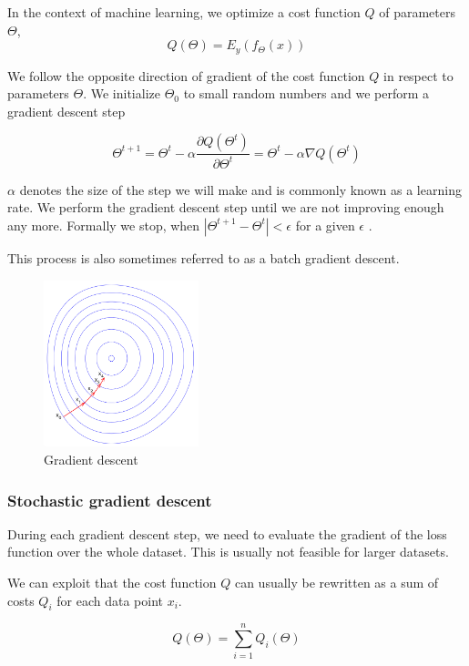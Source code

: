     In the context of machine learning, we optimize a cost function $Q$ of parameters $\Theta$, 
    $$Q(\Theta) = E_y(f_\Theta(x))$$
    
    We follow the opposite direction of gradient of the cost function $Q$ in respect to parameters $\Theta$. 
    We initialize $\Theta_0$ to small random numbers and we perform a gradient descent step
    
    $$\Theta^{t+1} = \Theta^t - \alpha \frac{\partial Q(\Theta^t)}{\partial \Theta^t} = \Theta^t - \alpha \nabla Q(\Theta^t)$$
    
    $\alpha$ denotes the size of the step we will make and is commonly known as a learning rate. 
    We perform the gradient descent step until we are not improving enough any more. 
    Formally we stop, when $|\Theta^{t+1} - \Theta^t| < \epsilon$ for a given $\epsilon$ \cite{bottou-bousquet-2008}.
    
    This process is also sometimes referred to as a batch gradient descent.

    \begin{figure}
    \centerline{\includegraphics[width=0.4\textwidth]{images/gradient_descent}}
    \caption[Gradient descent]{Gradient descent \cite{pict}}
    \label{obr:gradient}
    \end{figure}
    
    \subsubsection{Stochastic gradient descent}
    
    During each gradient descent step, we need to evaluate the gradient of the loss function over the whole dataset.
    This is usually not feasible for larger datasets. 
    
    We can exploit that the cost function $Q$ can usually be rewritten as a sum of costs $Q_i$ for each data point $x_i$.
    
    $$Q(\Theta) = \sum_{i=1}^n Q_i(\Theta)$$
    
